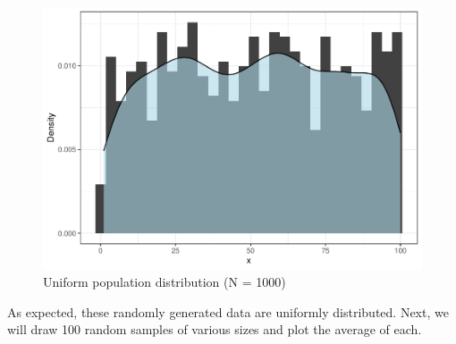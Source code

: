 \documentclass[
]{book}
\begin{document}
\begin{figure}

{\centering \includegraphics{The_Fundamentals_of_People_Analytics_files/figure-latex/unnamed-chunk-129-1} 

}

\caption{Uniform population distribution (N = 1000)}\label{fig:unnamed-chunk-129}
\end{figure}

As expected, these randomly generated data are uniformly distributed. Next, we will draw 100 random samples of various sizes and plot the average of each.
\end{document}
